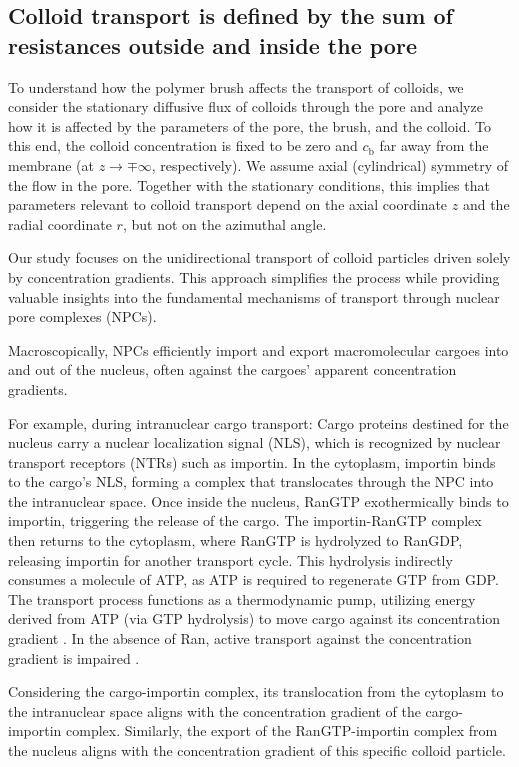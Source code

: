 \documentclass[12pt, a4paper]{article}
\begin{document}
\subsection{Colloid transport is defined by the sum of resistances outside and inside the pore}

To understand how the polymer brush affects the transport of colloids, we consider the stationary diffusive flux of colloids through the pore 
and analyze how it is affected by the parameters of the pore, the brush, and the colloid.
To this end, the colloid concentration is fixed to be zero and $c_{\text{b}}$ far away from the membrane (at $z\rightarrow\mp\infty$, respectively). 
We assume axial (cylindrical) symmetry of the flow in the pore. Together with the stationary conditions, 
this implies that parameters relevant to colloid transport depend on the axial coordinate $z$ and the radial coordinate $r$, but not on the azimuthal angle.

Our study focuses on the unidirectional transport of colloid particles driven solely by concentration gradients. This approach simplifies the process while providing valuable insights into the fundamental mechanisms of transport through nuclear pore complexes (NPCs).

Macroscopically, NPCs efficiently import and export macromolecular cargoes into and out of the nucleus, often against the cargoes' apparent concentration gradients.

For example, during intranuclear cargo transport:
Cargo proteins destined for the nucleus carry a nuclear localization signal (NLS), which is recognized by nuclear transport receptors (NTRs) such as importin. In the cytoplasm, importin binds to the cargo's NLS, forming a complex that translocates through the NPC into the intranuclear space. Once inside the nucleus, RanGTP exothermically binds to importin, triggering the release of the cargo. The importin-RanGTP complex then returns to the cytoplasm, where RanGTP is hydrolyzed to RanGDP, releasing importin for another transport cycle. This hydrolysis indirectly consumes a molecule of ATP, as ATP is required to regenerate GTP from GDP. The transport process functions as a thermodynamic pump, utilizing energy derived from ATP (via GTP hydrolysis) to move cargo against its concentration gradient \cite{Rout2003, Tijana2017}. In the absence of Ran, active transport against the concentration gradient is impaired \cite{Lowe2015, Yang2004}.

Considering the cargo-importin complex, its translocation from the cytoplasm to the intranuclear space aligns with the concentration gradient of the cargo-importin complex. Similarly, the export of the RanGTP-importin complex from the nucleus aligns with the concentration gradient of this specific colloid particle.
\end{document}

